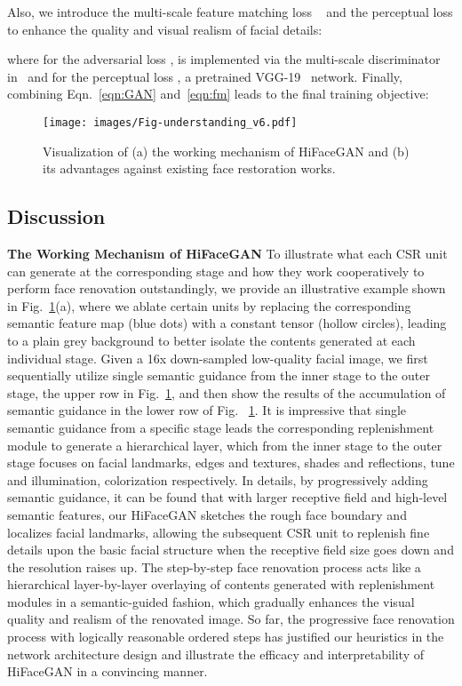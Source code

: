 \documentclass[sigconf]{acmart}
\begin{document}
Also, we introduce the multi-scale feature matching loss ~\cite{pix2pixHD} and the perceptual loss \cite{perceptual_loss} to enhance the quality and visual realism of facial details:


where for the adversarial loss ,  is implemented via the multi-scale discriminator  in~\cite{pix2pixHD} and for the perceptual loss , a pretrained VGG-19~\cite{vgg} network.
Finally, combining Eqn.~\eqref{eqn:GAN} and~\eqref{eqn:fm} leads to the final training objective:


\begin{figure}[!t]
	\centering
\texttt{[image: images/Fig-understanding\_v6.pdf]}
	\caption{Visualization of (a) the working mechanism of HiFaceGAN and (b) its advantages against existing face restoration works.
	}\label{fig:interp}
\end{figure}






\subsection{Discussion}\label{sec:understanding}
\textbf{The Working Mechanism of HiFaceGAN} To illustrate what each CSR unit can generate at the corresponding stage and how they work cooperatively to perform face renovation outstandingly, we provide an illustrative example shown in Fig.~\ref{fig:interp}(a), where we ablate certain units by replacing the corresponding semantic feature map (blue dots) with a constant tensor (hollow circles), leading to a plain grey background to better isolate the contents generated at each individual stage. Given a 16x down-sampled low-quality facial image, we first sequentially utilize single semantic guidance from the inner stage to the outer stage, the upper row in Fig.~\ref{fig:interp}, and then show the results of the accumulation of semantic guidance in the lower row of Fig. ~\ref{fig:interp}. It is impressive that single semantic guidance from a specific stage leads the corresponding replenishment module to generate a hierarchical layer, which from the inner stage to the outer stage focuses on facial landmarks, edges and textures, shades and reflections, tune and illumination, colorization respectively. In details, by progressively adding semantic guidance, it can be found that with larger receptive field and high-level semantic features, our HiFaceGAN sketches the rough face boundary and localizes facial landmarks, allowing the subsequent CSR unit to replenish fine details upon the basic facial structure when the receptive field size goes down and the resolution raises up. The step-by-step face renovation process acts like a hierarchical layer-by-layer overlaying of contents generated with replenishment modules in a semantic-guided fashion, which gradually enhances the visual quality and realism of the renovated image. So far, the progressive face renovation process with logically reasonable ordered steps has justified our heuristics in the network architecture design and illustrate the efficacy and interpretability of HiFaceGAN in a convincing manner.
\end{document}
